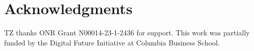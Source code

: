 \documentclass[11pt]{article}
\begin{document}






\newpage

\section*{Acknowledgments}\label{sec:acknowledgments}
TZ thanks ONR Grant N00014-23-1-2436 for support. This work was partially funded by the Digital Future Initiative at Columbia Business School.





\newpage
\begin{appendix}

\end{appendix}
\end{document}
